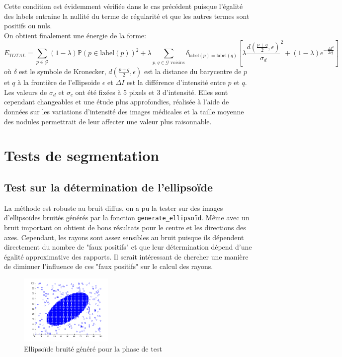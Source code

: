 \documentclass{article}
\newcommand{\lab}{\text{label}}
\begin{document}
Cette condition est évidemment vérifiée dans le cas précédent puisque l'égalité des labels entraine la nullité du terme de régularité et que les autres termes sont positifs ou nuls.\\
On obtient finalement une énergie de la forme:
\[
	E_{TOTAL} = \sum_{p \in \mathcal{G}} (1-\lambda)\mathbb{P}(p \in \lab(p))^2 + \lambda \sum _{p,q \in \mathcal{G} \text{ voisins}} \delta_{\lab(p) = \lab(q)} \left[ \lambda \frac{d\left(\frac{p+q}{2}, \epsilon \right)}{\sigma_d}^2 + (1-\lambda) e^{-\frac{\Delta I^2}{2\sigma_c^2}} \right]
\]
où $\delta$ est le symbole de Kronecker, $d\left(\frac{p+q}{2}, \epsilon \right)$ est la distance du barycentre de $p$ et $q$ à la frontière de l'ellipsoide $\epsilon$ et $\Delta I$ est la différence d'intensité entre $p$ et $q$. Les valeurs de $\sigma_d$ et $\sigma_c$ ont été fixées à 5 pixels et 3 d'intensité. Elles sont cependant changeables et une étude plus approfondies, réalisée à l'aide de données sur les variations d'intensité des images médicales et la taille moyenne des nodules permettrait de leur affecter une valeur plus raisonnable.

\section{Tests de segmentation}

\subsection{Test sur la détermination de l'ellipsoïde}


La méthode est robuste au bruit diffus, on a pu la tester sur des images d'ellipsoïdes bruités générés par la fonction \texttt{generate\_ellipsoïd}. Même avec un bruit important on obtient de bons résultats pour le centre et les directions des axes. Cependant, les rayons sont assez sensibles au bruit puisque ils dépendent directement du nombre de "faux positifs" et que leur détermination dépend d'une égalité approximative des rapports. Il serait intéressant de chercher une  manière de diminuer l'influence de ces "faux positifs" sur le calcul des rayons.

\begin{figure}[!h]
	\begin{center}
		\includegraphics[width=0.4\textwidth]{Images/Ellipsoide/ellipsoideBruite.png} 
	\end{center}
	\caption{Ellipsoïde bruité généré pour la phase de test}
	\label{fig:Ellipsoide}
\end{figure}
\end{document}
